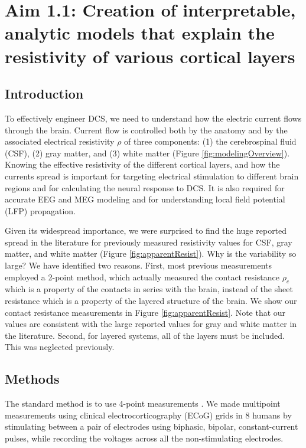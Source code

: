 
 
 
\chapter {Aim 1.1: Creation of interpretable, analytic models that explain the resistivity of various cortical layers}

\section{Introduction}

To effectively engineer DCS, we need to understand how the electric current flows through the brain. Current flow is controlled both by the anatomy and by the associated electrical resistivity $ \rho $ of three components: (1) the cerebrospinal fluid (CSF), (2) gray matter, and (3) white matter (Figure \ref{fig:modelingOverview}). Knowing the effective resistivity of the different cortical layers, and how the currents spread is important for targeting electrical stimulation to different brain regions and for calculating the neural response to DCS. It is also required for accurate EEG and MEG modeling and for understanding local field potential (LFP) propagation. 

Given its widespread importance, we were surprised to find the huge reported spread in the literature for previously measured resistivity values for CSF, gray matter, and white matter (Figure \ref{fig:apparentResist}).  Why is the variability so large? We have identified two reasons. First, most previous measurements employed a 2-point method, which actually measured the contact resistance $ \rho_{c} $which is a property of the contacts in series with the brain, instead of the sheet resistance which is a property of the layered structure of the brain. We show our contact resistance measurements in Figure \ref{fig:apparentResist}. Note that our values are consistent with the large reported values for gray and white matter in the literature. Second, for layered systems, all of the layers must be included. This was neglected previously. 

\section{Methods}

The standard method is to use 4-point measurements \cite{Miccoli2015}.  We made multipoint measurements using clinical electrocorticography (ECoG) grids in 8 humans by stimulating between a pair of electrodes using biphasic, bipolar, constant-current pulses, while recording the voltages across all the non-stimulating electrodes. 

